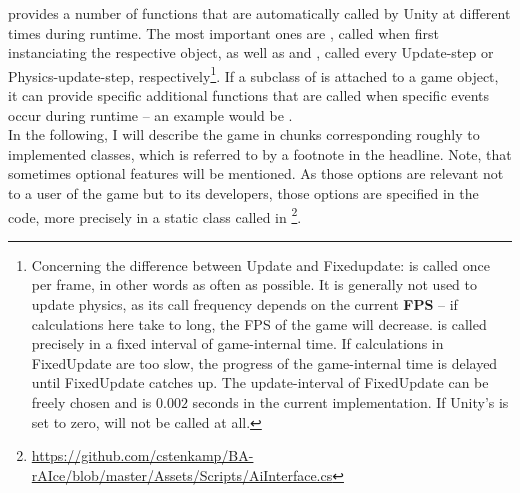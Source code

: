  provides a number of functions that are automatically called by Unity at different times during runtime. The most important ones are , called when first instanciating the respective object, as well as  and , called every Update-step or Physics-update-step, respectively\footnote{Concerning the difference between Update and Fixedupdate:  is called once per frame, in other words as often as possible. It is generally not used to update physics, as its call frequency depends on the current \textbf{FPS} -- if calculations here take to long, the FPS of the game will decrease.  is called precisely in a fixed interval of game-internal time. If calculations in FixedUpdate are too slow, the progress of the game-internal time is delayed until FixedUpdate catches up. The update-interval of FixedUpdate can be freely chosen and is $0.002$ seconds in the current implementation. If Unity's  is set to zero,  will not be called at all.}. If a subclass of  is attached to a game object, it can provide specific additional functions that are called when specific events occur during runtime -- an example would be .\\

\noindent In the following, I will describe the game in chunks corresponding roughly to implemented classes, which is referred to by a footnote in the headline. Note, that sometimes optional features will be mentioned. As those options are relevant not to a user of the game but to its developers, those options are specified in the code, more precisely in a static class called  in \footnote{\label{aiint} \url{https://github.com/cstenkamp/BA-rAIce/blob/master/Assets/Scripts/AiInterface.cs}}.



